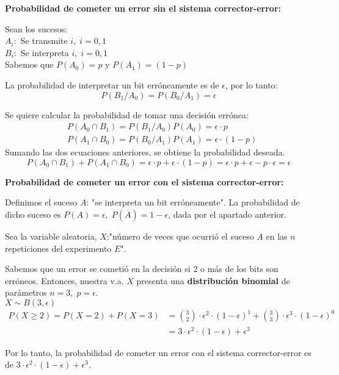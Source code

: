 \documentclass[11pt]{article}
\begin{document}
\textbf{Probabilidad de cometer un error sin el sistema corrector-error:}

Sean los sucesos: \\
$A_i:$ Se transmite $i,\;i=0,1$ \\
$B_i:$ Se interpreta $i,\;i=0,1$ \\
Sabemos que $P(A_0) = p$ y $P(A_1) = (1-p)$

La probabilidad de interpretar un bit erróneamente es de $\epsilon$, por lo tanto:
\begin{equation*}
  P(B_1/A_0) = P(B_0/A_1) = \epsilon
\end{equation*}

Se quiere calcular la probabilidad de tomar una decisión errónea:
\begin{align*}
  &P(A_0 \cap B_1) = P(B_1/A_0)P(A_0) = \epsilon \cdot p \\
  &P(A_1 \cap B_0) = P(B_0/A_1)P(A_1) = \epsilon \cdot (1-p)
\end{align*}
Sumando las dos ecuaciones anteriores, se obtiene la probabilidad deseada.
\begin{equation*}
  P(A_0 \cap B_1) + P(A_1 \cap B_0) = \epsilon \cdot p + \epsilon \cdot (1-p) =
  \epsilon \cdot p + \epsilon - p \cdot \epsilon = \epsilon
\end{equation*}

\textbf{Probabilidad de cometer un error con el sistema corrector-error:}

Definimos el suceso $A$: "se interpreta un bit erróneamente". La probabilidad de 
dicho suceso es $ P(A) = \epsilon, \; P(\overline{A}) = 1 - \epsilon $, dada
por el apartado anterior. 

Sea la variable aleatoria, $X$:"número de veces que ocurrió el suceso $A$
en las $n$ repeticiones del experimento $E$".

Sabemos que un error se cometió en la decisión si 2 o más de los bits son erróneos.
Entonces, nuestra v.a. $X$ presenta una \textbf{distribución binomial} de parámetros
$ n = 3, \; p = \epsilon $. \\
$ X \sim B(3, \epsilon) $
\begin{align*}
  P(X \geq 2) = P(X = 2) + P(X = 3) & = \binom{3}{2} \cdot  \epsilon^2 \cdot(1 - \epsilon)^1 + \binom{3}{3} \cdot \epsilon^3 \cdot (1 - \epsilon)^0 \\
                                    & = 3 \cdot \epsilon^2 \cdot (1 - \epsilon) + \epsilon^3
\end{align*}

Por lo tanto, la probabilidad de cometer un error con el sistema corrector-error
es de \newline $ 3 \cdot \epsilon^2 \cdot (1 - \epsilon) + \epsilon^3 $. \\
\end{document}
